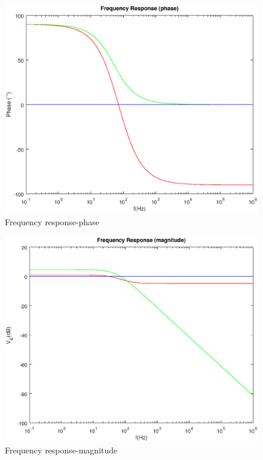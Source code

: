     \begin{figure}[H] \centering
    \includegraphics[width=1\linewidth]{degree.eps}
    \caption{Frequency response-phase}
    \label{fig:frequencyresponsephase}
    \end{figure}
    
      \begin{figure}[H] \centering
    \includegraphics[width=1\linewidth]{dB.eps}
    \caption{Frequency response-magnitude}
    \label{fig:frequencyresponsemagnitude}
    \end{figure}
  